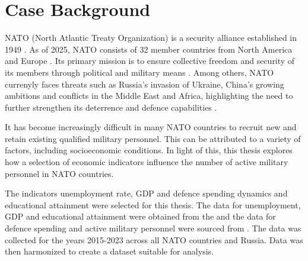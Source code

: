 \chapter{Case Background}

NATO (North Atlantic Treaty Organization) is a security
alliance established in 1949 \parencite{us_mission_to_nato_about_nodate}. As of 2025, NATO
consists of 32 member countries from North America and Europe \parencite{nato_what_nodate}.
Its primary mission is to ensure collective freedom and security of its members through 
political and military means \parencite{us_mission_to_nato_about_nodate}. Among others, NATO currenyly faces 
threats such as  Russia's invasion of Ukraine, China's growing ambitions and conflicts 
in the Middle East and Africa, highlighting the need to further strengthen its deterrence 
and defence capabilities \parencite{nato_nato_2022}.

It has become increasingly difficult in many NATO countries to recruit new 
and retain existing qualified military personnel. This can be attributed to 
a variety of factors, including socioeconomic conditions. \parencite{nato_research_and_technology_organization_recruiting_2007}
In light of this, this thesis explores how a selection of economic indicators 
influence the number of active military personnel in NATO countries.

The indicators unemployment rate, GDP and defence spending dynamics and educational 
attainment were selected for this thesis. The data for unemployment, GDP and educational 
attainment were obtained from the \textcite{noauthor_world_bank_nodate} and the data for defence spending 
and active military personnel were sourced from \textcite{noauthor_military_balance_nodate}. The data 
was collected for the years 2015-2023 across all NATO countries and Russia. 
Data was then harmonized to create a dataset suitable for analysis.
